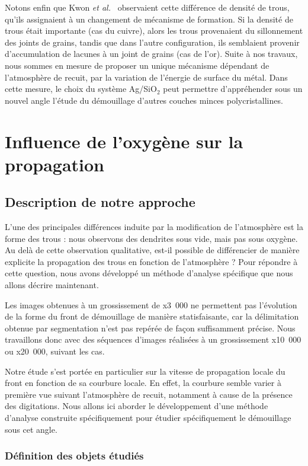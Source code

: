 {{Notons enfin que Kwon \textit{et al.}~\cite{kwon2003comparison} observaient cette différence de densité de trous, qu’ils assignaient à un changement de mécanisme de formation. Si la densité de trous était importante (cas du cuivre), alors les trous provenaient du sillonnement des joints de grains, tandis que dans l’autre configuration, ils semblaient provenir d’accumulation de lacunes à un joint de grains (cas de l’or). Suite à nos travaux, nous sommes en mesure de proposer un unique mécanisme dépendant de l’atmosphère de recuit, par la variation de l'énergie de surface du métal. Dans cette mesure, le choix du système Ag/SiO$_2$ peut permettre d'appréhender sous un nouvel angle l’étude du démouillage d’autres couches minces polycristallines.\par 
\section{Influence de l'oxygène sur la propagation}
		\subsection{Description de notre approche}
L’une des principales différences induite par la modification de l’atmosphère est la forme des trous : nous observons des dendrites sous vide, mais pas sous oxygène. Au delà de cette observation qualitative, est-il possible de différencier de manière explicite la propagation des trous en fonction de l’atmosphère ? Pour répondre à cette question, nous avons développé un méthode d’analyse spécifique que nous allons décrire maintenant.\par 
Les images obtenues à un grossissement de x3~000 ne permettent pas l'évolution de la forme du front de démouillage de manière statisfaisante, car la délimitation  obtenue par segmentation n'est pas repérée de façon suffisamment précise. Nous travaillons donc avec des séquences d'images réalisées à un grossissement x10~000 ou x20~000, suivant les cas.\par 
Notre étude s’est portée en particulier sur la vitesse de propagation locale du front en fonction de sa courbure locale. En effet, la courbure semble varier à première vue suivant l’atmosphère de recuit, notamment à cause de la présence des digitations. Nous allons ici aborder le développement d’une méthode d’analyse construite spécifiquement pour étudier spécifiquement le démouillage sous cet angle.\par 

			\subsubsection{Définition des objets étudiés}
}}
